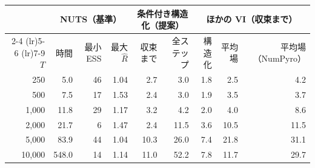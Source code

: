 \begin{tabular}{rrrrrrrrr}
\toprule
 & \multicolumn{3}{c}{NUTS（基準）} & \multicolumn{2}{c}{条件付き構造化（提案）} & \multicolumn{3}{c}{ほかの VI（収束まで）} \\
\cmidrule(lr){2-4} \cmidrule(lr){5-6} \cmidrule(lr){7-9}
$T$ & 時間 & 最小 ESS & 最大 $\hat R$ & 収束まで & 全ステップ & 構造化 & 平均場 & 平均場（NumPyro） \\
\midrule
250 & 5.0 & 46 & 1.04 & 2.7 & 3.0 & 1.8 & 2.5 & 4.2 \\
500 & 7.5 & 17 & 1.53 & 2.4 & 3.0 & 1.9 & 3.5 & 3.7 \\
1,000 & 11.8 & 29 & 1.17 & 3.2 & 4.2 & 2.0 & 4.0 & 8.6 \\
2,000 & 21.7 & 6 & 1.47 & 2.4 & 11.5 & 3.6 & 10.5 & 11.5 \\
5,000 & 83.9 & 44 & 1.04 & 10.3 & 26.0 & 7.4 & 21.8 & 31.1 \\
10,000 & 548.0 & 14 & 1.14 & 11.0 & 52.2 & 7.8 & 11.7 & 29.7 \\
\bottomrule
\end{tabular}
